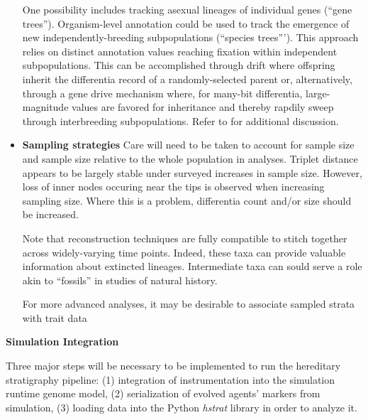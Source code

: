 \begin{itemize}
  One possibility includes tracking asexual lineages of individual genes (``gene trees'').
  Organism-level annotation could be used to track the emergence of new independently-breeding subpopulations (``species trees''').
  This approach relies on distinct annotation values reaching fixation within independent subpopulations.
  This can be accomplished through drift where offspring inherit the differentia record of a randomly-selected parent or, alternatively, through a gene drive mechanism where, for many-bit differentia, large-magnitude values are favored for inheritance and thereby rapdily sweep through interbreeding subpopulations. 
  Refer to \citep{moreno2024methods} for additional discussion.
\item \textbf{Sampling strategies}
Care will need to be taken to account for sample size and sample size relative to the whole population in analyses.
Triplet distance appears to be largely stable under surveyed increases in sample size.
However, loss of inner nodes occuring near the tips is observed when increasing sampling size.
Where this is a problem, differentia count and/or size should be increased.

Note that reconstruction techniques are fully compatible to stitch together across widely-varying time points.
Indeed, these taxa can provide valuable information about extincted lineages.
Intermediate taxa can sould serve a role akin to ``fossils'' in studies of natural history.

For more advanced analyses, it may be desirable to associate sampled strata with trait data \citep{TODOMODES,TODOCITEFROMJACOB}

\end{itemize}

\textbf{Simulation Integration}

Three major steps will be necessary to be implemented to run the hereditary stratigraphy pipeline: (1) integration of instrumentation into the simulation runtime genome model, (2) serialization of evolved agents' markers from simulation, (3) loading data into the Python \textit{hstrat} library in order to analyze it.

